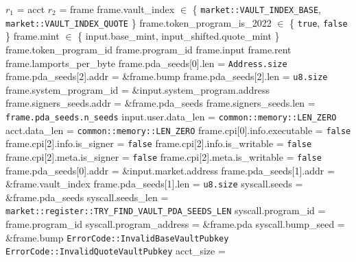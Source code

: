 \begin{algorithm}
\caption{INIT-VAULT}
\begin{algorithmic}
  \INPUT $r_1$ = acct
  \INPUT $r_2$ = frame
  \REQUIRE frame.vault\_index $\in$ \{
    \texttt{market::VAULT\_INDEX\_BASE},
    \texttt{market::VAULT\_INDEX\_QUOTE}
  \}
  \REQUIRE frame.token\_program\_is\_2022 $\in$ \{
    \texttt{true},
    \texttt{false}
  \}
  \REQUIRE frame.mint $\in$ \{
    input.base\_mint,
    input\_shifted.quote\_mint
  \}
  \REQUIRE frame.token\_program\_id
  \REQUIRE frame.program\_id
  \REQUIRE frame.input
  \REQUIRE frame.rent
  \REQUIRE frame.lamports\_per\_byte
  \REQUIRE frame.pda\_seeds[0].len = \texttt{Address.size}
  \REQUIRE frame.pda\_seeds[2].addr = \&frame.bump
  \REQUIRE frame.pda\_seeds[2].len = \texttt{u8.size}
  \REQUIRE frame.system\_program\_id = \&input.system\_program.address
  \REQUIRE frame.signers\_seeds.addr = \&frame.pda\_seeds
  \REQUIRE frame.signers\_seeds.len = \texttt{frame.pda\_seeds.n\_seeds}
  \REQUIRE input.user.data\_len = \texttt{common::memory::LEN\_ZERO}
  \REQUIRE acct.data\_len = \texttt{common::memory::LEN\_ZERO}
  \REQUIRE frame.cpi[0].info.executable = \texttt{false}
  \REQUIRE frame.cpi[2].info.is\_signer = \texttt{false}
  \REQUIRE frame.cpi[2].info.is\_writable = \texttt{false}
  \REQUIRE frame.cpi[2].meta.is\_signer = \texttt{false}
  \REQUIRE frame.cpi[2].meta.is\_writable = \texttt{false}
  \STATE {}
  \STATE {}
  \STATE frame.pda\_seeds[0].addr = \&input.market.address
  \STATE frame.pda\_seeds[1].addr = \&frame.vault\_index
  \STATE frame.pda\_seeds[1].len = \texttt{u8.size}
  \STATE syscall.seeds = \&frame.pda\_seeds
  \STATE syscall.seeds\_len = \texttt{market::register::TRY\_FIND\_VAULT\_PDA\_SEEDS\_LEN}
  \STATE syscall.program\_id = frame.program\_id
  \STATE syscall.program\_address = \&frame.pda
  \STATE syscall.bump\_seed = \&frame.bump
  \STATE {}
      \RETURN \texttt{ErrorCode::InvalidBaseVaultPubkey}
    \ELSE
      \RETURN \texttt{ErrorCode::InvalidQuoteVaultPubkey}
    \ENDIF
  \ENDIF
  \STATE acct\_size = 
  \STATE {}
  \STATE {}
\ENDFUNCTION
\end{algorithmic}
\end{algorithm}
